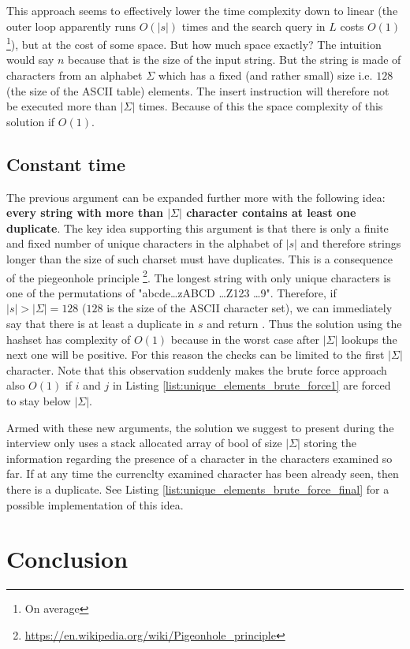 This approach seems to effectively lower the time complexity down to linear (the outer loop apparently runs $O(|s|)$ times and the search query in $L$ costs $O(1)$\footnote{On average}),
but at the cost of some space. But how much space exactly? The intuition would say $n$ because that is the size of the
input string. But the string is made of characters from an alphabet $\Sigma$ which has a fixed (and rather small) size i.e. $128$ (the size of the ASCII table)
elements. 
The insert instruction will therefore not be executed more than $|\Sigma|$ times. Because of this the space complexity of this solution if
$O(1)$. 

\subsection{Constant time}
The previous argument can be expanded further more with the following idea: \textbf{every string
with more than $|\Sigma|$ character contains at least one duplicate}.
The key idea supporting this argument is that there is only a finite and fixed
number of unique characters in the alphabet of $|s|$ and therefore strings longer than the size of such charset must have duplicates. 
This is a consequence of the piegeonhole principle \footnote{\url{https://en.wikipedia.org/wiki/Pigeonhole_principle}}.
The longest string with only unique characters is one of the permutations of "abcde\ldots zABCD \ldots Z123 \ldots 9". 
Therefore, if $|s| > |\Sigma| = 128$ ($128$ is the size of the ASCII character set), we can immediately say that there 
is at least a duplicate in $s$ and return .
Thus the solution using the hashset has complexity of $O(1)$ because in the worst case after $|\Sigma|$
lookups the next one will be positive.
For this reason the checks can be limited to the first $|\Sigma|$ character. 
Note that this observation suddenly makes the brute force approach also $O(1)$
if $i$ and $j$ in Listing \ref{list:unique_elements_brute_force1} are forced to stay below
$|\Sigma|$.

Armed with these new arguments, the solution we suggest to present during the interview only uses a
stack allocated array of bool of size $|\Sigma|$ storing the information regarding the presence of a
character in the characters examined so far. If at any time the currenclty examined character has
been already seen, then there is a duplicate. See Listing
\ref{list:unique_elements_brute_force_final} for a possible implementation of this idea.

\begin{minipage}{\linewidth}
	
\end{minipage}

\section{Conclusion}